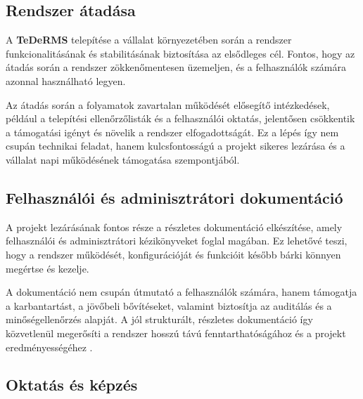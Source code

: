 \subsection{Rendszer átadása}

A \textbf{TeDeRMS} telepítése a vállalat környezetében során a rendszer funkcionalitásának és stabilitásának biztosítása az elsődleges cél.  
Fontos, hogy az átadás során a rendszer zökkenőmentesen üzemeljen, és a felhasználók számára azonnal használható legyen.  

Az átadás során a folyamatok zavartalan működését elősegítő intézkedések, például a telepítési ellenőrzőlisták és 
a felhasználói oktatás, jelentősen csökkentik a támogatási igényt és növelik a rendszer elfogadottságát.  
Ez a lépés így nem csupán technikai feladat, hanem kulcsfontosságú a projekt sikeres lezárása és a vállalat napi működésének támogatása szempontjából.


\subsection{Felhasználói és adminisztrátori dokumentáció}

A projekt lezárásának fontos része a részletes dokumentáció elkészítése, amely felhasználói és adminisztrátori kézikönyveket foglal magában.  
Ez lehetővé teszi, hogy a rendszer működését, konfigurációját és funkcióit később bárki könnyen megértse és kezelje.  

A dokumentáció nem csupán útmutató a felhasználók számára, hanem támogatja a karbantartást, a jövőbeli bővítéseket, valamint biztosítja az auditálás és a minőségellenőrzés alapját.  
A jól strukturált, részletes dokumentáció így közvetlenül megerősíti a rendszer hosszú távú fenntarthatóságához és a projekt eredményességéhez \cite{Hajdu2014,Kaposi2019}.


\subsection{Oktatás és képzés}

